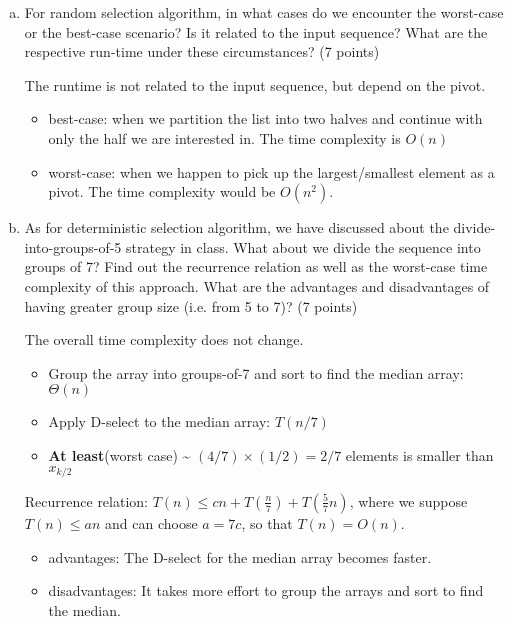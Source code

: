 \documentclass[11pt]{exam}
\begin{document}
\begin{enumerate}[(a)] \label{prb:tiger_code}

\item For random selection algorithm, in what cases do we encounter the worst-case or the best-case scenario? Is it related to the input sequence? What are the respective run-time under these circumstances? (7 points)

\begin{solution}
    The runtime is not related to the input sequence, but depend on the pivot.
    \begin{itemize}
        \item best-case:  when we partition the list into two halves and continue with only the half we are interested in. 
        The time complexity is $O(n)$
        \item worst-case: when we happen to pick up the largest/smallest element as a pivot.
        The time complexity would be $O(n^2)$.
    \end{itemize}
\end{solution}

\item As for deterministic selection algorithm, we have discussed about the divide-into-groups-of-5 strategy in class. What about we divide the sequence into groups of 7? Find out the recurrence relation as well as the worst-case time complexity of this approach. What are the advantages and disadvantages of having greater group size (i.e. from 5 to 7)? (7 points)

\begin{solution}
    The overall time complexity does not change. 
    \begin{itemize}
        \item Group the array into groups-of-7 and sort to find the median array: $\Theta(n)$
        \item Apply D-select to the median array: $T(n/7)$
        \item \textbf{At least}(worst case) \~{} $(4/7) \times (1/2) = 2/7$ elements is smaller than $x_{k/2}$
    \end{itemize}
    Recurrence relation: $T(n) \leq cn + T (\frac{n}{7}) + T(\frac{5}{7}n)$, where we suppose $T(n)\leq an$ and can choose $a = 7c$,
    so that $T(n) = O(n)$.
    \begin{itemize}
        \item advantages: The D-select for the median array becomes faster.
        \item disadvantages: It takes more effort to group the arrays and sort to find the median.
    \end{itemize}
\end{solution}

\end{enumerate}
\end{document}
